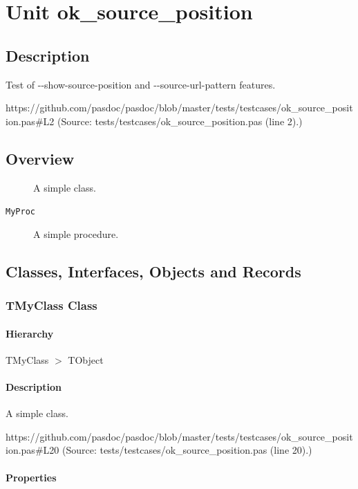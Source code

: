 \documentclass{report}
\begin{document}
\newlength{\tmplength}
\chapter{Unit ok{\_}source{\_}position}
\section{Description}
Test of {-}{-}show{-}source{-}position and {-}{-}source{-}url{-}pattern features.\par
https://github.com/pasdoc/pasdoc/blob/master/tests/testcases/ok{\_}source{\_}position.pas{\#}L2 (Source: tests/testcases/ok{\_}source{\_}position.pas (line 2).)
\section{Overview}
\begin{description}
\item[\texttt{\begin{ttfamily}TMyClass\end{ttfamily} Class}]A simple class.
\end{description}
\begin{description}
\item[\texttt{MyProc}]A simple procedure.
\end{description}
\section{Classes, Interfaces, Objects and Records}
\subsection*{TMyClass Class}
\subsubsection*{\large{\textbf{Hierarchy}}\normalsize\hspace{1ex}\hfill}
TMyClass {$>$} TObject
\subsubsection*{\large{\textbf{Description}}\normalsize\hspace{1ex}\hfill}
A simple class.\par
https://github.com/pasdoc/pasdoc/blob/master/tests/testcases/ok{\_}source{\_}position.pas{\#}L20 (Source: tests/testcases/ok{\_}source{\_}position.pas (line 20).)\subsubsection*{\large{\textbf{Properties}}\normalsize\hspace{1ex}\hfill}
\end{document}

